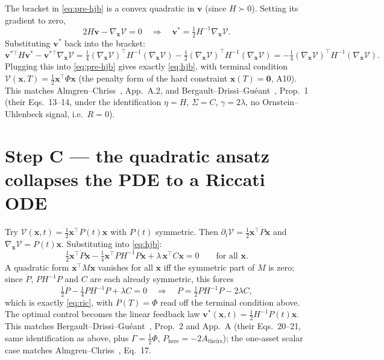 \documentclass[11pt,a4paper]{article}
\begin{document}
The bracket in \eqref{eq:pre-hjb} is a convex quadratic in $\mathbf v$ (since
$H\succ0$). Setting its gradient to zero,
\[
2H\mathbf v-\nabla_{\mathbf x}\mathcal V=0\quad\Longrightarrow\quad
\mathbf v^*=\tfrac12H^{-1}\nabla_{\mathbf x}\mathcal V.
\]
Substituting $\mathbf v^*$ back into the bracket:
\[
\mathbf v^{*\top}H\mathbf v^*-\mathbf v^{*\top}\nabla_{\mathbf x}\mathcal V
=\tfrac14(\nabla_{\mathbf x}\mathcal V)^\top H^{-1}(\nabla_{\mathbf x}\mathcal
V)-\tfrac12(\nabla_{\mathbf x}\mathcal V)^\top H^{-1}(\nabla_{\mathbf x}
\mathcal V)=-\tfrac14(\nabla_{\mathbf x}\mathcal V)^\top
H^{-1}(\nabla_{\mathbf x}\mathcal V).
\]
Plugging this into \eqref{eq:pre-hjb} gives exactly \eqref{eq:hjb}, with
terminal condition $\mathcal V(\mathbf x,T)=\tfrac12\mathbf x^\top\Phi\mathbf
x$ (the penalty form of the hard constraint $\mathbf x(T)=\mathbf 0$, A10).
This matches Almgren--Chriss~\cite{almgrenchriss2000}, App.~A.2, and
Bergault--Drissi--Gu\'eant~\cite{bergault2022}, Prop.~1 (their Eqs.~13--14,
under the identification $\eta=H$, $\Sigma=C$, $\gamma=2\lambda$, no
Ornstein--Uhlenbeck signal, i.e.\ $R=0$).

\section*{Step C --- the quadratic ansatz collapses the PDE to a Riccati ODE}

Try $\mathcal V(\mathbf x,t)=\tfrac12\mathbf x^\top P(t)\mathbf x$ with
$P(t)$ symmetric. Then $\partial_t\mathcal V=\tfrac12\mathbf x^\top\dot
P\mathbf x$ and $\nabla_{\mathbf x}\mathcal V=P(t)\mathbf x$. Substituting
into \eqref{eq:hjb}:
\[
\tfrac12\mathbf x^\top\dot P\mathbf x-\tfrac14\mathbf x^\top PH^{-1}P\mathbf
x+\lambda\,\mathbf x^\top C\mathbf x=0\qquad\text{for all }\mathbf x.
\]
A quadratic form $\mathbf x^\top M\mathbf x$ vanishes for all $\mathbf x$ iff
the symmetric part of $M$ is zero; since $\dot P$, $PH^{-1}P$ and $C$ are
each already symmetric, this forces
\[
\tfrac12\dot P-\tfrac14PH^{-1}P+\lambda C=0\quad\Longrightarrow\quad
\dot P=\tfrac12PH^{-1}P-2\lambda C,
\]
which is exactly \eqref{eq:ric}, with $P(T)=\Phi$ read off the terminal
condition above. The optimal control becomes the linear feedback law
$\mathbf v^*(\mathbf x,t)=\tfrac12H^{-1}P(t)\mathbf x$. This matches
Bergault--Drissi--Gu\'eant~\cite{bergault2022}, Prop.~2 and App.~A
(their Eqs.~20--21, same identification as above, plus $\Gamma=\tfrac12\Phi$,
$P_{\text{here}}=-2A_{\text{theirs}}$); the one-asset scalar case matches
Almgren--Chriss~\cite{almgrenchriss2000}, Eq.~17.
\end{document}
